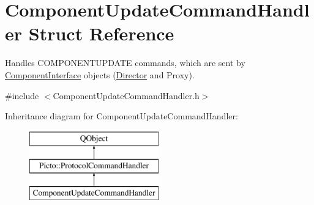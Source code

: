 \hypertarget{struct_component_update_command_handler}{\section{Component\-Update\-Command\-Handler Struct Reference}
\label{struct_component_update_command_handler}
}


Handles C\-O\-M\-P\-O\-N\-E\-N\-T\-U\-P\-D\-A\-T\-E commands, which are sent by \hyperlink{class_component_interface}{Component\-Interface} objects (\hyperlink{class_director}{Director} and Proxy).  




{\ttfamily \#include $<$Component\-Update\-Command\-Handler.\-h$>$}

Inheritance diagram for Component\-Update\-Command\-Handler\-:\begin{figure}[H]
\begin{center}
\leavevmode
\includegraphics[height=3.000000cm]{struct_component_update_command_handler}
\end{center}
\end{figure}
